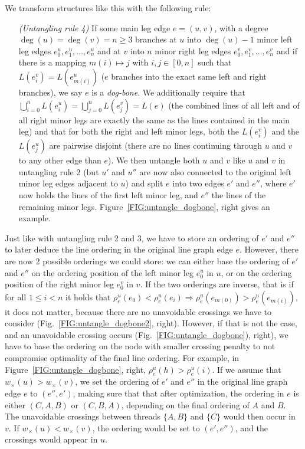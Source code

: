 \documentclass[format=acmsmall, review=false, screen=true]{acmart}
\begin{document}
We transform structures like this with the following rule:

\begin{enumerate}[parsep=0.5mm, wide, labelwidth=0mm, itemindent=2.3mm]
  \setlength\itemsep{1pt}
  \item[\emph{(Untangling rule 4)}] If some main leg edge $e = (u, v)$, with a degree $\deg(u) = \deg(v) = n \geq 3$ branches at $u$ into $\deg(u) - 1$ minor left leg edges $e^u_{0}, e^u_{1}, ..., e^u_{n}$ and at $v$ into $n$ minor right leg edges $e^v_{0}, e^v_{1}, ..., e^v_{n}$ and if there is a mapping $m(i) \mapsto j$ with $i, j \in [0, n]$ such that $L(e^v_i) = L(e^u_{m(i)})$ ($e$ branches into the exact same left and right branches), we say $e$ is a \emph{dog-bone}.
  We additionally require that $\bigcup^{n}_{i = 0} L(e^u_{i}) = \bigcup^{n}_{j = 0} L(e^v_{j}) = L(e)$ (the combined lines of all left and of all right minor legs are exactly the same as the lines contained in the main leg) and that for both the right and left minor legs, both the $L(e^v_i)$ and the $L(e^u_j)$ are pairwise disjoint (there are no lines continuing through $u$ and $v$ to any other edge than $e$).
  We then untangle both $u$ and $v$ like $u$ and $v$ in untangling rule 2 (but $u'$ and $u''$ are now also connected to the original left minor leg edges adjacent to $u$) and split $e$ into two edges $e'$ and $e''$, where $e'$ now holds the lines of the first left minor leg, and $e''$ the lines of the remaining minor legs. Figure~\ref{FIG:untangle_dogbone}, right gives an example.
\end{enumerate}

Just like with untangling rule 2 and 3, we have to store an ordering of $e'$ and $e''$ to later deduce the line ordering in the original line graph edge $e$.
However, there are now 2 possible orderings we could store: we can either base the ordering of $e'$ and $e''$ on the ordering position of the left minor leg $e^u_0$ in $u$, or on the ordering position of the right minor leg $e^v_0$ in $v$. If the two orderings are inverse, that is if for all $1 \leq i < n$ it holds that $\rho^u_e(e_0) < \rho^u_e(e_i) \Rightarrow \rho^u_e(e_{m(0)}) > \rho^u_e(e_{m(i)})$, it does not matter, because there are no unavoidable crossings we have to consider (Fig.~\ref{FIG:untangle_dogbone2}, right).
However, if that is not the case, and an unavoidable crossing occurs (Fig.~\ref{FIG:untangle_dogbone}), right), we have to base the ordering on the node with smaller crossing penalty to not compromise optimality of the final line ordering.
For example, in Figure~\ref{FIG:untangle_dogbone}, right, $\rho^u_e(h) > \rho^u_e(i)$.
If we assume that $w_\times(u) > w_\times(v)$, we set the ordering of $e'$ and $e''$ in the original line graph edge $e$ to $(e'', e')$, making sure that that after optimization, the ordering in $e$ is either $(C, A, B)$ or $(C, B, A)$, depending on the final ordering of $A$ and $B$.
The unavoidable crossings between threads $\{A, B\}$ and $\{C\}$ would then occur in $v$. If $w_\times(u) < w_\times(v)$, the ordering would be set to $(e', e'')$, and the crossings would appear in $u$.
\end{document}
